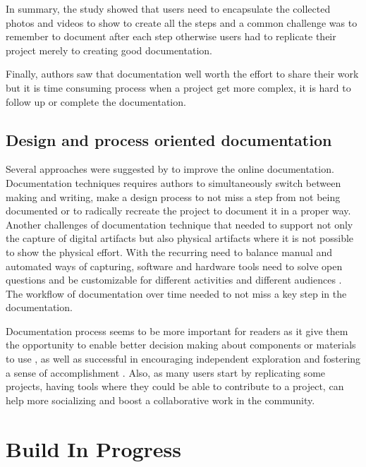 In summary, the study showed that users need to encapsulate the collected photos and videos to show to create all the steps and a common challenge was to remember to document after each step otherwise users had to replicate their project merely to creating good documentation. 

Finally, authors saw that documentation well worth the effort to share their work but it is time consuming process when a project get more complex, it is hard to follow up or complete the documentation. \cite{scholar:Wakkary:2015:TAH:2702123.2702550}

\subsection{Design and process oriented documentation}
Several approaches were suggested by to improve the online documentation. Documentation techniques requires authors to simultaneously switch between making and writing, make a design process to not miss a step from not being documented or to radically recreate the project to document it in a proper way. Another challenges of documentation technique that needed to support not only the capture of digital artifacts but also physical artifacts where it is not possible to show the physical effort. 
With the recurring need to balance manual and automated ways of capturing, software and hardware tools need to solve open questions and be customizable for different activities and different audiences \cite{Kuznetsov:2010:REA:1868914.1868950}. The workflow of documentation over time needed to not miss a key step in the documentation. 

Documentation process seems to be more important for readers as it give them the opportunity to enable better decision making about components or materials to use \cite{scholar:sf1241364}, as well as successful in encouraging independent exploration and fostering a sense of accomplishment \cite{scholar:lovell2010sewing}. Also, as many users start by replicating some projects, having tools where they could be able to contribute to a project, can help more socializing and boost a collaborative work in the community. 

\section{Build In Progress}

